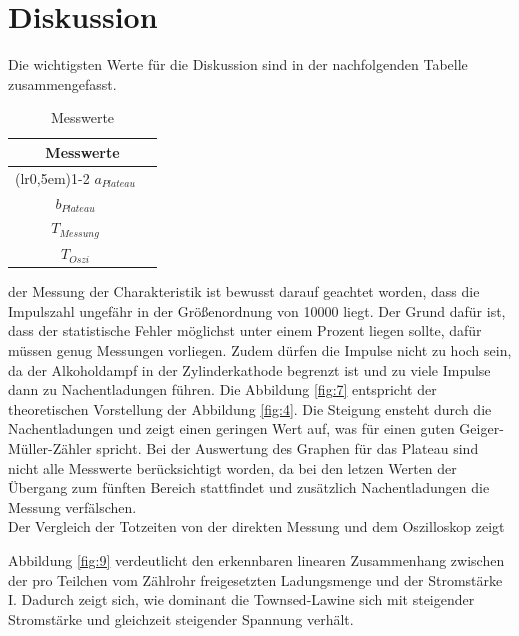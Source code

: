 \section{Diskussion}
Die wichtigsten Werte für die Diskussion sind in der nachfolgenden Tabelle zusammengefasst.
\begin{table}[H]
\centering
\caption{Messwerte}
\begin{tabular}{c c}
    \toprule
    \multicolumn{2}{c}{Messwerte}\\
    \cmidrule(lr{0,5em}){1-2}
    $a_{Plateau}$ &  \\
    $b_{Plateau} $ &  \\
    $T_{Messung}$ & \\
    $T_{Oszi}$ & \\
    \bottomrule
\end{tabular}
\label{tab:3}
\end{table}

\justifying der Messung der Charakteristik ist bewusst darauf geachtet worden, dass
die Impulszahl ungefähr in der Größenordnung von 10000 liegt. Der Grund dafür ist,
dass der statistische Fehler möglichst unter einem Prozent liegen sollte, dafür müssen genug Messungen
vorliegen. Zudem dürfen die Impulse nicht zu hoch sein, da der Alkoholdampf in der
Zylinderkathode begrenzt ist und zu viele Impulse dann zu Nachentladungen führen.
Die Abbildung \ref{fig:7} entspricht der theoretischen Vorstellung der Abbildung 
\ref{fig:4}. Die Steigung ensteht durch die Nachentladungen und zeigt einen
geringen Wert auf, was für einen guten Geiger-Müller-Zähler spricht.
Bei der Auswertung des Graphen für das Plateau sind nicht alle Messwerte 
berücksichtigt worden, da bei den letzen Werten der Übergang zum
fünften Bereich stattfindet und zusätzlich Nachentladungen die Messung
verfälschen. \\
Der Vergleich der Totzeiten von der direkten Messung und dem Oszilloskop zeigt


\justifying Abbildung \ref{fig:9} verdeutlicht den erkennbaren linearen Zusammenhang
zwischen der pro Teilchen vom Zählrohr freigesetzten Ladungsmenge und 
der Stromstärke I. Dadurch zeigt sich, wie dominant die Townsed-Lawine sich mit
steigender Stromstärke und gleichzeit steigender Spannung verhält.



\newpage
\printbibliography


